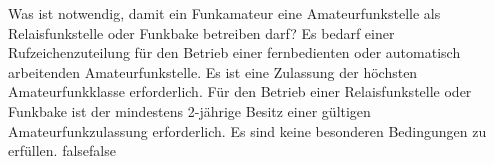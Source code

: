     {Was ist notwendig, damit ein Funkamateur eine Amateurfunkstelle als Relaisfunkstelle oder Funkbake betreiben darf?}
    {Es bedarf einer Rufzeichenzuteilung für den Betrieb einer fernbedienten oder automatisch arbeitenden Amateurfunkstelle.}
    {Es ist eine Zulassung der höchsten Amateurfunkklasse erforderlich.}
    {Für den Betrieb einer Relaisfunkstelle oder Funkbake ist der mindestens 2-jährige Besitz einer gültigen Amateurfunkzulassung erforderlich.}
    {Es sind keine besonderen Bedingungen zu erfüllen.}
    {false}{false}